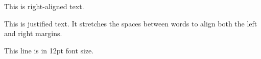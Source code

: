 \documentclass{article}
\begin{document}
\begin{flushright}
    This is right-aligned text.
\end{flushright}

\begin{justify}
    This is justified text. It stretches the spaces between words to align both the left and right margins.
\end{justify}

{\fontsize{12pt}{140pt}\selectfont This line is in 12pt font size.}

\end{document}
